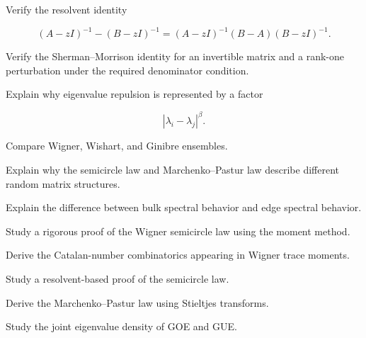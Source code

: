 \begin{exercise}[3]
Verify the resolvent identity

\[
(A-zI)^{-1}-(B-zI)^{-1}
=
(A-zI)^{-1}(B-A)(B-zI)^{-1}.
\]
\end{exercise}

\begin{exercise}[3]
Verify the Sherman--Morrison identity for an invertible matrix and a
rank-one perturbation under the required denominator condition.
\end{exercise}

\begin{exercise}[3]
Explain why eigenvalue repulsion is represented by a factor

\[
|\lambda_i-\lambda_j|^\beta.
\]
\end{exercise}

\begin{exercise}[3]
Compare Wigner, Wishart, and Ginibre ensembles.
\end{exercise}

\begin{exercise}[3]
Explain why the semicircle law and Marchenko--Pastur law describe
different random matrix structures.
\end{exercise}

\begin{exercise}[3]
Explain the difference between bulk spectral behavior and edge spectral
behavior.
\end{exercise}

\begin{exercise}[4]
Study a rigorous proof of the Wigner semicircle law using the moment
method.
\end{exercise}

\begin{exercise}[4]
Derive the Catalan-number combinatorics appearing in Wigner trace
moments.
\end{exercise}

\begin{exercise}[4]
Study a resolvent-based proof of the semicircle law.
\end{exercise}

\begin{exercise}[4]
Derive the Marchenko--Pastur law using Stieltjes transforms.
\end{exercise}

\begin{exercise}[4]
Study the joint eigenvalue density of GOE and GUE.
\end{exercise}

